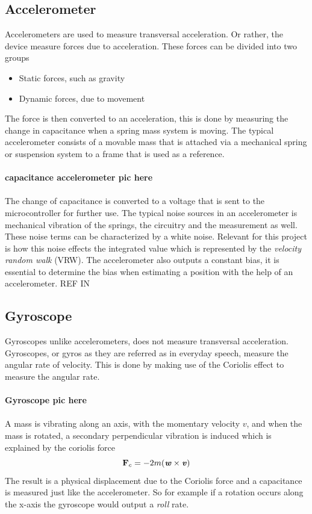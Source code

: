 \documentclass[a4paper,11pt]{kth-mag}
\begin{document}
\subsection{Accelerometer}
Accelerometers are used to measure transversal acceleration. Or rather, the device measure forces due to acceleration. These forces can be divided into two groups 
\begin{itemize}
\item Static forces, such as gravity
\item Dynamic forces, due to movement
\end{itemize}
The force is then converted to an acceleration, this is done by measuring the change in capacitance when a spring mass system is moving. The typical accelerometer consists of a movable mass that is attached via a mechanical spring or suspension system to a frame that is used as a reference. 
\\ \\
\textbf{capacitance accelerometer pic here}
\\ \\
The change of capacitance is converted to a voltage that is sent to the microcontroller for further use. The typical noise sources in an accelerometer is mechanical vibration of the springs, the circuitry and the measurement as well. These noise terms can be characterized by a white noise. Relevant for this project is how this noise effects the integrated value which is represented by the \textit{velocity random walk} (VRW). The accelerometer also outputs a constant bias, it is essential to determine the bias when estimating a position with the help of an accelerometer.
REF IN

\subsection{Gyroscope}
Gyroscopes unlike accelerometers, does not measure transversal acceleration. Gyroscopes, or gyros as they are referred as in everyday speech, measure the angular rate of velocity. This is done by making use of the Coriolis effect to measure the angular rate.
\\ \\
\textbf{Gyroscope pic here}
\\ \\
A mass is vibrating along an axis, with the momentary velocity $v$, and when the mass is rotated, a secondary perpendicular vibration is induced which is explained by the coriolis force
\begin{equation}\label{eq:coriolis}
\textbf{F}_c = -2m(\textbf{\textit{w}} \times \textbf{\textit{v}})
\end{equation}
The result is a physical displacement due to the Coriolis force and a capacitance is measured just like the accelerometer. So for example if a rotation occurs along the x-axis the gyroscope would output a \textit{roll} rate.
\end{document}
